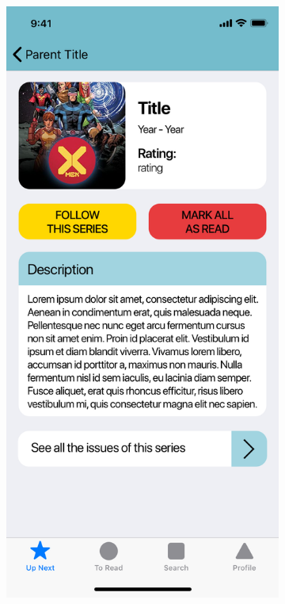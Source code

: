 \clearpage

\begin{figure}[p]
  \begin{subfigure}[b]{0.4\textwidth}
    \includegraphics[width=\textwidth]{img/mockups/series}

\end{subfigure}
\end{figure}
